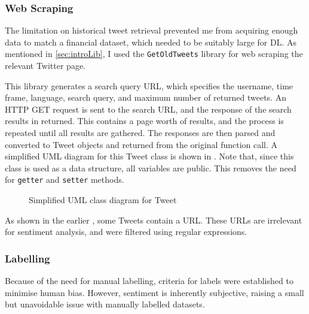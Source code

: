 \documentclass[12pt,a4paper,twoside,openright]{report}
\begin{document}
\subsubsection{Web Scraping}
\label{sec:impCrawl}

The limitation on historical tweet retrieval prevented me from acquiring enough data to match a financial dataset,
which needed to be suitably large for DL.
As mentioned in \cref{sec:introLib}, I used the \texttt{GetOldTweets} library for web scraping the relevant Twitter page.

This library generates a search query URL, which specifies the username, time frame, language,
search query, and maximum number of returned tweets. An HTTP GET request is sent to the search URL,
and the response of the search results in returned. This contains a page
worth of results, and the process is repeated until all results are gathered. The responses are then parsed and
converted to Tweet objects and returned from the original function call. A simplified UML diagram for this
Tweet class is shown in . Note that, since this class is used as a
data structure, all variables are public. This removes the need for \texttt{getter} and \texttt{setter} methods.

\begin{figure}[H]
\centering
{}
\caption{Simplified UML class diagram for Tweet}
\label{fig:UMLTweet}
\end{figure}

As shown in the earlier , some Tweets contain
a URL. These URLs are irrelevant for sentiment analysis, and were filtered using
regular expressions.

\subsubsection{Labelling}
\label{sec:impLabel}

Because of the need for manual labelling, criteria for labels were established
to minimise human bias. However, sentiment is inherently
subjective, raising a small but unavoidable issue with manually labelled datasets.
\end{document}

